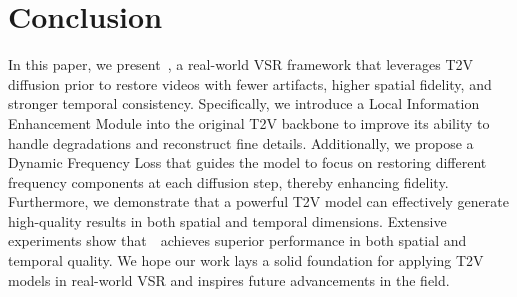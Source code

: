 \section{Conclusion}
In this paper, we present~\name, a real-world VSR framework that leverages T2V diffusion prior to restore videos with fewer artifacts, higher spatial fidelity, and stronger temporal consistency. Specifically, we introduce a Local Information Enhancement Module into the original T2V backbone to improve its ability to handle degradations and reconstruct fine details. Additionally, we propose a Dynamic Frequency Loss that guides the model to focus on restoring different frequency components at each diffusion step, thereby enhancing fidelity. Furthermore, we demonstrate that a powerful T2V model can effectively generate high-quality results in both spatial and temporal dimensions. Extensive experiments show that~\name~achieves superior performance in both spatial and temporal quality. We hope our work lays a solid foundation for applying T2V models in real-world VSR and inspires future advancements in the field.